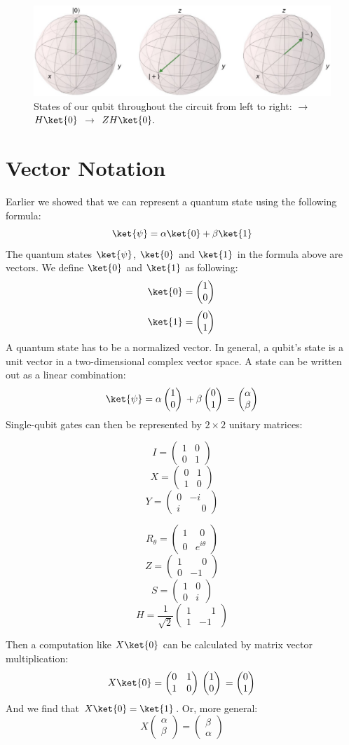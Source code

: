 \documentclass[11pt, notitlepage]{report}
\newcommand{\igate}{
  \begin{pmatrix}
  1 & 0 \\
  0 & 1
  \end{pmatrix}
}
\newcommand{\xgate}{
  \begin{pmatrix}
  0 & 1 \\
  1 & 0
  \end{pmatrix}
}
\newcommand{\ygate}{
  \begin{pmatrix}
  0 & -i \\
  i & \phantom{-}0
  \end{pmatrix}
}
\newcommand{\zgate}{
  \begin{pmatrix}
  1 & \phantom{-}0 \\
  0 & -1
  \end{pmatrix}
}
\newcommand{\hgate}{
  \dfrac{1}{\sqrt2}
  \begin{pmatrix}
  1 & \phantom{-}1 \\
  1 & -1
  \end{pmatrix}
}
\newcommand{\sgate}{
  \begin{pmatrix}
  1 & 0 \\
  0 & i
  \end{pmatrix}
}
\newcommand{\phasegate}{
  \begin{pmatrix}
  1 & \phantom{e}0 \\
  0 & e^{i\theta}
  \end{pmatrix}
}
\newcommand{\qstatezero}{
  \begin{pmatrix}1 \\ 0\end{pmatrix}
}
\newcommand{\qstateone}{
  \begin{pmatrix}0 \\ 1\end{pmatrix}
}
\begin{document}
\begin{figure}[ht]
  \centering
  \includegraphics[scale=0.37]{images/simple_circuit.eps}
  \caption{States of our qubit throughout the circuit from left to right:  $\rightarrow$ $H\ket{0}$ $\rightarrow$ $ZH\ket{0}.$}
  \label{fig:gate_rotations}
\end{figure}

\section{Vector Notation} \label{sec:matrix_notation}
Earlier we showed that we can represent a quantum state using the following formula:
\[\ket{\psi} = \alpha\ket{0} + \beta\ket{1}\]
The quantum states $\ket{\psi}$, $\ket{0}$ and $\ket{1}$ in the formula above are vectors. We define $\ket{0}$ and $\ket{1}$ as following:
\[\ket{0} = \qstatezero{}\]
\[\ket{1} = \qstateone{}\]
A quantum state has to be a normalized vector. In general, a qubit's state is a unit vector in a two-dimensional complex vector space. A state can be written out as a linear combination:
\[
  \ket{\psi} = \alpha\qstatezero{} + \beta\qstateone{} =
\begin{pmatrix}\alpha \\ \beta\end{pmatrix}
\]
Single-qubit gates can then be represented by $2 \times 2$ unitary matrices:
\setlength\multicolsep{0pt}
\begin{multicols}{3}
  \[
    I = \igate{}
  \]
  \vfill
  \[
    X = \xgate{}
  \]
  \vfill
  \[
    Y = \ygate{}
  \]
\end{multicols}

\begin{multicols}{4}
  \[
    R_\theta = \phasegate{}
  \]
  \vfill
  \[
    Z = \zgate{}
  \]
  \vfill
  \[
    S = \sgate{}
  \]
    \vfill
  \[
    H = \hgate{}
  \]
\end{multicols}
\bigskip
\noindent
Then a computation like $X\ket{0}$ can be calculated by matrix vector multiplication:
\[
X\ket{0} = \xgate{} \qstatezero{} = \qstateone{}
\]
And we find that $X\ket{0} = \ket{1}$. Or, more general:
\[
  X\begin{pmatrix}\alpha \\ \beta\end{pmatrix} = \begin{pmatrix}\beta \\ \alpha\end{pmatrix}
\]
\end{document}
